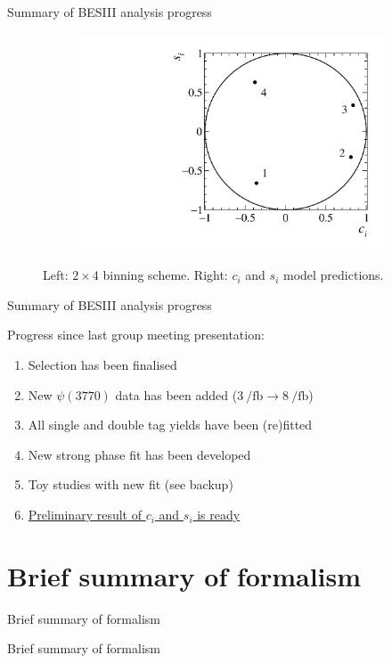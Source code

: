 \documentclass{beamer}
\begin{document}
\begin{frame}{Summary of BESIII analysis progress}
\begin{figure}
\begin{subfigure}{0.30\textwidth}
      \includegraphics[width = 1.0\textwidth]{Plots/StrongPhaseParametersPlot_cisi_4Bins.pdf}
    \end{subfigure}
    \caption{Left: $2\times4$ binning scheme. Right: $c_i$ and $s_i$ model predictions.}
  \end{figure}
\end{frame}

\begin{frame}{Summary of BESIII analysis progress}
  \begin{center}
    \Large{Progress since last group meeting presentation:}
  \end{center}
  \vspace{0.5cm}
  \begin{enumerate}
    \setlength\itemsep{0.5em}
    \item{Selection has been finalised}
    \item{New $\psi(3770)$ data has been added ($\SI{3}{\per\femto\barn}\to\SI{8}{\per\femto\barn}$)}
    \item{All single and double tag yields have been (re)fitted}
    \item{New strong phase fit has been developed}
    \item{Toy studies with new fit (see backup)}
    \item{\underline{Preliminary result of $c_i$ and $s_i$ is ready}}
  \end{enumerate}
\end{frame}

\section{Brief summary of formalism}
\begin{frame}{Brief summary of formalism}
  \begin{center}
    {\huge Brief summary of formalism}
  \end{center}
\end{frame}
\end{document}
